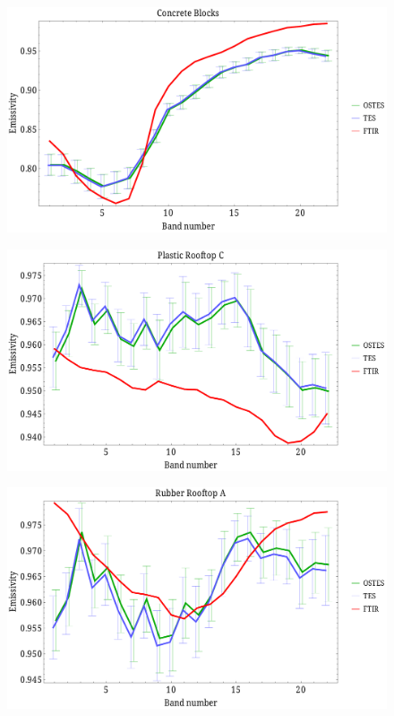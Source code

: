 \documentclass[xcolor=dvipsnames]{beamer}
\begin{document}
\begin{frame}[plain]{}
\begin{figure}[htb]
	\centering
	\includegraphics[scale=0.35]{ConcreteBlocks_scaled.pdf}
\end{figure}
\end{frame}

\begin{frame}[plain]{}
\begin{figure}[htb]
	\centering
	\includegraphics[scale=0.35]{PlasticRooftopC_scaled.pdf}
\end{figure}
\end{frame}

\begin{frame}[plain]{}
\begin{figure}[htb]
	\centering
	\includegraphics[scale=0.35]{RubberRooftopA_scaled.pdf}
\end{figure}
\end{frame}
\end{document}
